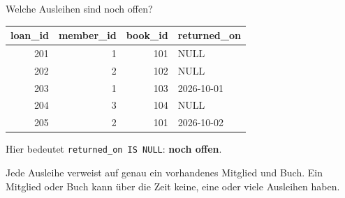 \begin{frame}[t]{Welche Ausleihen sind noch offen?}

\small\centering\begin{tabular}{rrrl}\toprule
loan\_id & member\_id & book\_id & returned\_on\\\midrule
201 & 1 & 101 & NULL\\202 & 2 & 102 & NULL\\
203 & 1 & 103 & 2026-10-01\\204 & 3 & 104 & NULL\\
205 & 2 & 101 & 2026-10-02\\\bottomrule\end{tabular}
\par\vspace{4mm}\raggedright\normalsize
Hier bedeutet \texttt{returned\_on IS NULL}: \textbf{noch offen}.\par
\smallskip Jede Ausleihe verweist auf genau ein vorhandenes Mitglied und Buch.
Ein Mitglied oder Buch kann über die Zeit keine, eine oder viele Ausleihen haben.

\end{frame}
